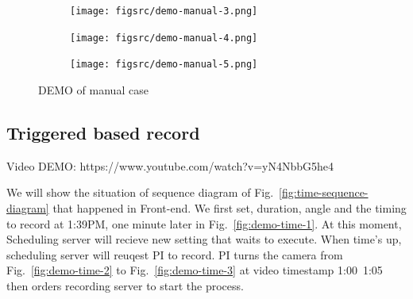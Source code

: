 \begin{figure}[H]
    \ContinuedFloat
    \centering
    \begin{subfigure}{\textwidth}
        \texttt{[image: figsrc/demo-manual-3.png]}
        \label{fig:demo-manual-3}
    \end{subfigure}
\end{figure}

\begin{figure}[H]
    \ContinuedFloat
    \centering
    \begin{subfigure}{\textwidth}
        \texttt{[image: figsrc/demo-manual-4.png]}
        \label{fig:demo-manual-4}
    \end{subfigure}
\end{figure}


\begin{figure}[H]
    \ContinuedFloat
    \centering
    \begin{subfigure}{\textwidth}
        \texttt{[image: figsrc/demo-manual-5.png]}
        \label{fig:demo-manual-5}
    \end{subfigure}

    \caption{DEMO of manual case}
    \label{fig:demo-manual}
\end{figure}

\subsection{Triggered based record}
Video DEMO: https://www.youtube.com/watch?v=yN4NbbG5he4

We will show the situation of sequence diagram of Fig.~\ref{fig:time-sequence-diagram} that happened in Front-end. We first set, duration, angle and the timing to record at 1:39PM, one minute later in Fig.~\ref{fig:demo-time-1}. At this moment, Scheduling server will recieve new setting that waits to execute. When time's up, scheduling server will reuqest PI to record. PI turns the camera from Fig.~\ref{fig:demo-time-2} to Fig.~\ref{fig:demo-time-3} at video timestamp 1:00~1:05 then orders recording server to start the process.

